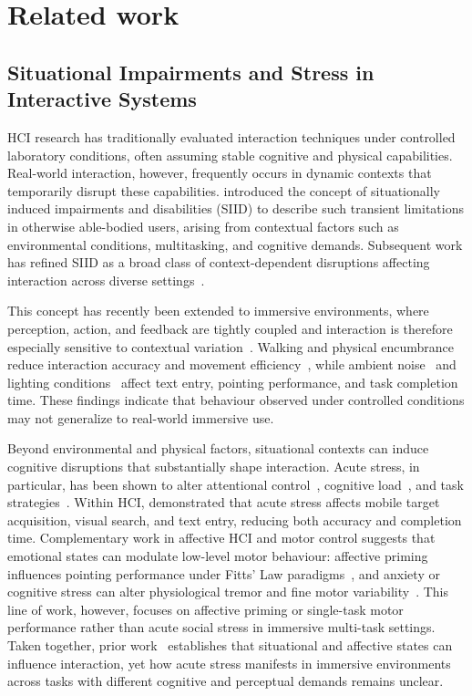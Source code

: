 \section{Related work}
\label{sec:relatedwork}

\subsection{Situational Impairments and Stress in Interactive Systems}
HCI research has traditionally evaluated interaction techniques under controlled laboratory conditions, often assuming stable cognitive and physical capabilities. Real-world interaction, however, frequently occurs in dynamic contexts that temporarily disrupt these capabilities. \citet{sears2003computers} introduced the concept of situationally induced impairments and disabilities (SIID) to describe such transient limitations in otherwise able-bodied users, arising from contextual factors such as environmental conditions, multitasking, and cognitive demands. Subsequent work has refined SIID as a broad class of context-dependent disruptions affecting interaction across diverse settings~\citep{li2026survey}.

This concept has recently been extended to immersive environments, where perception, action, and feedback are tightly coupled and interaction is therefore especially sensitive to contextual variation~\citep{li2026survey}. Walking and physical encumbrance reduce interaction accuracy and movement efficiency~\citep{li2025estimating}, while ambient noise~\citep{li2025noise} and lighting conditions~\citep{liu2025understanding} affect text entry, pointing performance, and task completion time. These findings indicate that behaviour observed under controlled conditions may not generalize to real-world immersive use.

Beyond environmental and physical factors, situational contexts can induce cognitive disruptions that substantially shape interaction. Acute stress, in particular, has been shown to alter attentional control~\citep{sarsenbayeva2019measuring}, cognitive load~\citep{hou2025cognitive}, and task strategies~\citep{mcguire2023stress}. Within HCI, \citet{sarsenbayeva2019measuring} demonstrated that acute stress affects mobile target acquisition, visual search, and text entry, reducing both accuracy and completion time. Complementary work in affective HCI and motor control suggests that emotional states can modulate low-level motor behaviour: affective priming influences pointing performance under Fitts' Law paradigms~\citep{joo2026quantifying}, and anxiety or cognitive stress can alter physiological tremor and fine motor variability~\citep{budini2022mental}. This line of work, however, focuses on affective priming or single-task motor performance rather than acute social stress in immersive multi-task settings. Taken together, prior work~\citep{sarsenbayeva2019measuring, joo2026quantifying, budini2022mental} establishes that situational and affective states can influence interaction, yet how acute stress manifests in immersive environments across tasks with different cognitive and perceptual demands remains unclear.

